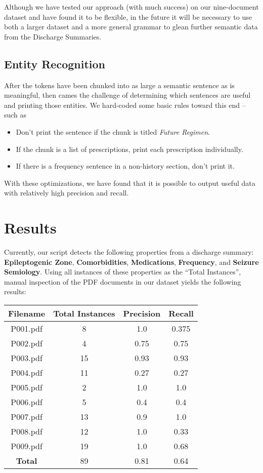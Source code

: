 \documentclass{acm_proc_article-sp}
\begin{document}
Although we have tested our approach (with much success) on our nine-document dataset and have found it
to be flexible, in the future it will be necessary
to use both a larger dataset and a more general grammar to glean further semantic
data from the Discharge Summaries.
\subsection{Entity Recognition}
After the tokens have been chunked into as large a semantic sentence as is meaningful, then cames
the challenge of determining which sentences are useful and printing those entities. We hard-coded
some basic rules toward this end -- such as
\begin{itemize}
\item Don't print the sentence if the chunk is titled \textit{Future Regimen}.
\item If the chunk is a list of prescriptions, print each prescription individually.
\item If there is a frequency sentence in a non-history section, don't print it.
\end{itemize}

With these optimizations, we have found that it is possible to output useful data with relatively
high precision and recall.
\section{Results}
Currently, our script detects the following properties from a discharge summary:
\textbf{Epileptogenic Zone}, \textbf{Comorbidities}, \textbf{Medications}, \textbf{Frequency}, and
\textbf{Seizure Semiology}. Using all instances of these properties as the ``Total Instances'', manual inspection 
of the PDF documents in our dataset yields the following results:

\begin{tabular}{c c c c}
 \textbf{Filename} & \textbf{Total Instances} & \textbf{Precision} & \textbf{Recall} \\
 \hline
 P001.pdf & 8 & 1.0 & 0.375 \\ 
 P002.pdf & 4 & 0.75 & 0.75 \\
 P003.pdf & 15 & 0.93 & 0.93 \\
 P004.pdf & 11 & 0.27 & 0.27 \\
 P005.pdf & 2 & 1.0 & 1.0 \\
 P006.pdf & 5 & 0.4 & 0.4 \\
 P007.pdf & 13 & 0.9 & 1.0 \\
 P008.pdf & 12 & 1.0 & 0.33 \\
 P009.pdf & 19 & 1.0 & 0.68 \\
 \hline
 \textbf{Total} & 89 & 0.81 & 0.64
\end{tabular}
\end{document}
